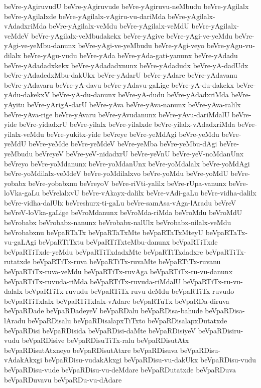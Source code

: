 {beVre-yAgiruvudU
beVre-yAgiruvude
beVre-yAgiruvu-neMbudu
beVre-yAgilalx
beVre-yAgilalxde
beVre-yAgilalx-vAgiru-vu-dariMda
beVre-yAgilalx-vAdadxriMda
beVre-yAgilalx-veMdu
beVre-yAgilalx-veMdU
beVre-yAgilalx-veMdeV
beVre-yAgilalx-veMbudakekx
beVre-yAgive
beVre-yAgi-ve-yeMdu
beVre-yAgi-ve-yeMbu-danunx
beVre-yAgi-ve-yeMbudu
beVre-yAgi-veyo
beVre-yAgu-vu-dilalx
beVre-yAgu-vudu
beVre-yAda
beVre-yAda-gati-yanunx
beVre-yAdadu
beVre-yAdadadxkekx
beVre-yAdadadxnunx
beVre-yAdadudx
beVre-yA-dadUdx
beVre-yAdadedxMbu-dakUkx
beVre-yAdarU
beVre-yAdare
beVre-yAdavanu
beVre-yAdavaru
beVre-yA-davu
beVre-yAdavu-gaLige
beVre-yA-du-dakekx
beVre-yAdu-dakekxV
beVre-yA-du-danunx
beVre-yA-dudu
beVre-yAdadxriMda
beVre-yAyitu
beVre-yArigA-darU
beVre-yAva
beVre-yAva-nanunx
beVre-yAva-ralilx
beVre-yAva-rige
beVre-yAvaru
beVre-yAvudanunx
beVre-yAvu-dariMdalU
beVre-yide
beVre-yidadxrU
beVre-yilalx
beVre-yilalxde
beVre-yilalx-vAdadxriMda
beVre-yilalx-veMdu
beVre-yukitx-yide
beVreye
beVre-yeMdAgi
beVre-yeMdu
beVre-yeMdU
beVre-yeMde
beVre-yeMdeV
beVre-yeMba
beVre-yeMbu-dAgi
beVre-yeMbudu
beVreyeV
beVre-yeV-nidadxrU
beVre-yeVnU
beVre-yeV-noMdanUnx
beVreyo
beVre-yoMdanunx
beVre-yoMdanUnx
beVre-yoMdalalx
beVre-yoMdAgi
beVre-yoMdilalx-veMdeV
beVre-yoMdilalxvo
beVre-yoMdu
beVre-yoMdU
beVre-yobabx
beVre-yobabxnu
beVreyoV
beVre-riVti-yalilx
beVre-rUpa-vanunx
beVre-loVka-gaLu
beVrelalxvU
beVre-vAkayx-dalilx
beVre-vAdi-gaLu
beVre-vidha-dalilx
beVre-vidha-dalUlx
beVreshurx-ti-gaLu
beVre-samAsa-vAga-lAradu
beVreV
beVreV-loVka-gaLige
beVroMdanunx
beVroMda-riMda
beVroMdu
beVroMdU
beVrobabx
beVrobabx-nanunx
beVrobabx-nalUlx
beVrobabx-nilalx-veMdu
beVrobabxnu
beVpaRTaTx
beVpaRTaTxMte
beVpaRTaTxMteyU
beVpaRTaTx-vu-gaLAgi
beVpaRTiTxtu
beVpaRTiTxteMbu-danunx
beVpaRTiTxde
beVpaRTiTxde-yeMdu
beVpaRTiTxdadxMte
beVpaRTiTxdadxre
beVpaRTiTx-rutatxde
beVpaRTiTx-ruva
beVpaRTiTx-ruvaMte
beVpaRTiTx-ruvanu
beVpaRTiTx-ruva-veMdu
beVpaRTiTx-ruvAga
beVpaRTiTx-ru-vu-danunx
beVpaRTiTx-ruvuda-riMda
beVpaRTiTx-ruvuda-riMdalU
beVpaRTiTx-ru-vu-dalalx
beVpaRTiTx-ruvudu
beVpaRTiTx-ruvu-deMdu
beVpaRTiTx-ruvudo
beVpaRTiTxlalx
beVpaRTiTxlalx-vAdare
beVpaRTuTx
beVpaRDa-diruva
beVpaRDade
beVpaRDadeyeV
beVpaRDalu
beVpaRDisa-bahude
beVpaRDisa-lAradu
beVpaRDisalu
beVpaRDisalapxTiTxto
beVpaRDisalapxDutatxde
beVpaRDisi
beVpaRDisida
beVpaRDisi-daMte
beVpaRDisiyeV
beVpaRDisiru-vudu
beVpaRDisive
beVpaRDisuTiTx-ralu
beVpaRDisutAtx
beVpaRDisutAtxneyo
beVpaRDisutAtxre
beVpaRDisuva
beVpaRDisu-vAdakAkxgi
beVpaRDisu-vudakAkxgi
beVpaRDisu-vu-dakUkx
beVpaRDisu-vudu
beVpaRDisu-vude
beVpaRDisu-vu-deMdare
beVpaRDutatxde
beVpaRDuva
beVpaRDuvavu
beVpaRDu-vu-dAdare
}

